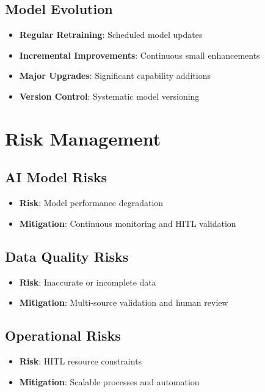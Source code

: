 \documentclass[business]{../templates/infraradar-main}
\begin{document}
\subsection{Model Evolution}
\begin{itemize}
    \item \textbf{Regular Retraining}: Scheduled model updates
    \item \textbf{Incremental Improvements}: Continuous small enhancements
    \item \textbf{Major Upgrades}: Significant capability additions
    \item \textbf{Version Control}: Systematic model versioning
\end{itemize}

\section{Risk Management}

\subsection{AI Model Risks}
\begin{itemize}
    \item \textbf{Risk}: Model performance degradation
    \item \textbf{Mitigation}: Continuous monitoring and HITL validation
\end{itemize}

\subsection{Data Quality Risks}
\begin{itemize}
    \item \textbf{Risk}: Inaccurate or incomplete data
    \item \textbf{Mitigation}: Multi-source validation and human review
\end{itemize}

\subsection{Operational Risks}
\begin{itemize}
    \item \textbf{Risk}: HITL resource constraints
    \item \textbf{Mitigation}: Scalable processes and automation
\end{itemize}
\end{document}
